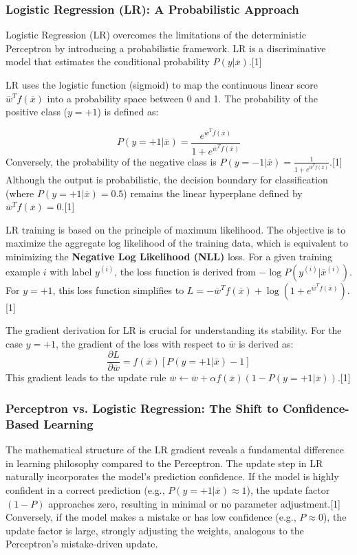 \documentclass{article}
\begin{document}
\subsubsection{Logistic Regression (LR): A Probabilistic Approach}

Logistic Regression (LR) overcomes the limitations of the deterministic Perceptron by introducing a probabilistic framework. LR is a discriminative model that estimates the conditional probability $P(y|\overline{x})$.[1]

LR uses the logistic function (sigmoid) to map the continuous linear score $\overline{w}^{T}f(\overline{x})$ into a probability space between 0 and 1. The probability of the positive class ($y=+1$) is defined as:

$$P(y=+1|\overline{x})=\frac{e^{\overline{w}^{T}f(\overline{x})}}{1+e^{\overline{w}^{T}f(\overline{x})}}$$
Conversely, the probability of the negative class is $P(y=-1|\overline{x})=\frac{1}{1+e^{\overline{w}^{T}f(\overline{x})}}$.[1] Although the output is probabilistic, the decision boundary for classification (where $P(y=+1|\overline{x}) = 0.5$) remains the linear hyperplane defined by $\overline{w}^{T}f(\overline{x}) = 0$.[1]

LR training is based on the principle of maximum likelihood. The objective is to maximize the aggregate log likelihood of the training data, which is equivalent to minimizing the \textbf{Negative Log Likelihood (NLL)} loss. For a given training example $i$ with label $y^{(i)}$, the loss function is derived from $-\log P(y^{(i)}|\overline{x}^{(i)})$. For $y=+1$, this loss function simplifies to $L = -\overline{w}^{T}f(\overline{x}) + \log(1+e^{\overline{w}^{T}f(\overline{x})})$.[1]

The gradient derivation for LR is crucial for understanding its stability. For the case $y=+1$, the gradient of the loss with respect to $\overline{w}$ is derived as:
$$\frac{\partial L}{\partial\overline{w}} = f(\overline{x})[P(y=+1|\overline{x})-1]$$
This gradient leads to the update rule $\overline{w} \leftarrow \overline{w} + \alpha f(\overline{x})(1-P(y=+1|\overline{x}))$.[1]

\subsubsection{Perceptron vs. Logistic Regression: The Shift to Confidence-Based Learning}

The mathematical structure of the LR gradient reveals a fundamental difference in learning philosophy compared to the Perceptron. The update step in LR naturally incorporates the model's prediction confidence. If the model is highly confident in a correct prediction (e.g., $P(y=+1|\overline{x}) \approx 1$), the update factor $(1-P)$ approaches zero, resulting in minimal or no parameter adjustment.[1] Conversely, if the model makes a mistake or has low confidence (e.g., $P \approx 0$), the update factor is large, strongly adjusting the weights, analogous to the Perceptron's mistake-driven update.
\end{document}

